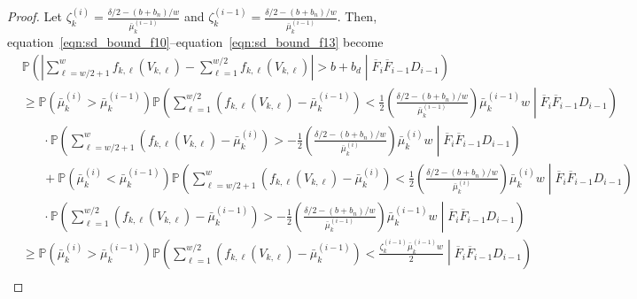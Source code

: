 \documentclass[twoside]{article}
\def\eqref#1{equation~\ref{#1}}
\theoremstyle{plain}
\theoremstyle{definition}
\theoremstyle{remark}
\begin{document}
\begin{proof}
Let $\zeta_{k}^{(i)}=\frac{\delta/2-\left(b+b_n\right)/w}{\bar{\mu}^{(i-1)}_{k}}$ and $\zeta_{k}^{(i-1)}=\frac{\delta/2-\left(b+b_n\right)/w}{\bar{\mu}^{(i-1)}_{k}}$. Then, \eqref{eqn:sd_bound_f10}--\eqref{eqn:sd_bound_f13} become
\begin{subequations}
    \begin{align} 
        &\mathbb{P}\left(\left\lvert\sum^{w}_{\ell=w/2+1}f_{k,\ell}\left(V_{k,\ell}\right)-\sum^{w/2}_{\ell=1}f_{k,\ell}\left(V_{k,\ell}\right)\right\rvert > b + b_d \middle| \overline{F}_{i}\overline{F}_{i-1} D_{i-1}\right)\label{eqn:sd_bound_f14}\\
        &\geq \mathbb{P}\left(\bar{\mu}^{(i)}_{k}>\bar{\mu}^{(i-1)}_{k}\right)\mathbb{P}\left(\sum^{w/2}_{\ell=1}\left(f_{k,\ell}\left(V_{k,\ell}\right)-\bar{\mu}_{k}^{(i-1)}\right)< \frac{1}{2}\left(\frac{\delta/2-\left(b+b_n\right)/w}{\bar{\mu}^{(i-1)}_{k}}\right)\bar{\mu}^{(i-1)}_{k}w \middle| \overline{F}_{i}\overline{F}_{i-1} D_{i-1}\right)\label{eqn:sd_bound_f15}\\
        &\hspace{20pt} \cdot \mathbb{P}\left(\sum^{w}_{\ell=w/2+1}\left(f_{k,\ell}\left(V_{k,\ell}\right)-\bar{\mu}_{k}^{(i)}\right) > -\frac{1}{2}\left(\frac{\delta/2-\left(b+b_n\right)/w}{\bar{\mu}^{(i)}_{k}}\right)\bar{\mu}^{(i)}_{k}w \middle| \overline{F}_{i}\overline{F}_{i-1} D_{i-1}\right)\label{eqn:sd_bound_f16}\\
        &\hspace{20pt} + \mathbb{P}\left(\bar{\mu}^{(i)}_{k}<\bar{\mu}^{(i-1)}_{k}\right)\mathbb{P}\left(\sum^{w}_{\ell=w/2+1}\left(f_{k,\ell}\left(V_{k,\ell}\right)-\bar{\mu}_{k}^{(i)}\right)< \frac{1}{2}\left(\frac{\delta/2-\left(b+b_n\right)/w}{\bar{\mu}^{(i)}_{k}}\right)\bar{\mu}^{(i)}_{k}w \middle| \overline{F}_{i}\overline{F}_{i-1} D_{i-1}\right)\label{eqn:sd_bound_f17}\\
        &\hspace{20pt} \cdot \mathbb{P}\left(\sum^{w/2}_{\ell=1}\left(f_{k,\ell}\left(V_{k,\ell}\right)-\bar{\mu}_{k}^{(i-1)}\right) > -\frac{1}{2}\left(\frac{\delta/2-\left(b+b_n\right)/w}{\bar{\mu}^{(i-1)}_{k}}\right)\bar{\mu}^{(i-1)}_{k}w \middle| \overline{F}_{i}\overline{F}_{i-1} D_{i-1}\right)\label{eqn:sd_bound_f18}\\
        &\geq \mathbb{P}\left(\bar{\mu}^{(i)}_{k}>\bar{\mu}^{(i-1)}_{k}\right)\mathbb{P}\left(\sum^{w/2}_{\ell=1}\left(f_{k,\ell}\left(V_{k,\ell}\right)-\bar{\mu}_{k}^{(i-1)}\right)< \frac{\zeta_{k}^{(i-1)}\bar{\mu}^{(i-1)}_{k}w}{2} \middle| \overline{F}_{i}\overline{F}_{i-1} D_{i-1}\right)\label{eqn:sd_bound_f16}\\

\end{align}
\end{subequations}
\end{proof}
\end{document}
